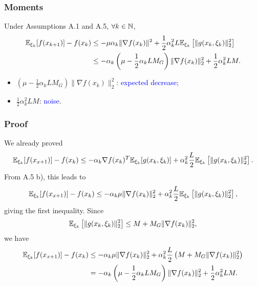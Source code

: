 \documentclass[usepdftitle=false, aspectratio=169]{beamer}
\begin{document}
\begin{frame}
\frametitle{Moments}

\begin{theorem}
	Under Assumptions A.1 and A.5, $\forall k \in {\mathbb{N}}$,
	\begin{align*}
		{\mathbb{E}}_{\xi_k}[f(x_{k+1})] - f(x_k)
		& \leq - \mu \alpha_k \| \nabla f(x_k) \|^2
		+ \frac{1}{2} \alpha_k^2 L {\mathbb{E}}_{\xi_k} \left[ \| g(x_k, \xi_k )\|_2^2 \right] \\
		& \leq - \alpha_k\left( \mu -\frac{1}{2}\alpha_k LM_G \right) \| \nabla f(x_k) \|_2^2
		+ \frac{1}{2} \alpha_k^2 LM.
	\end{align*}
\end{theorem}
\begin{itemize}
	\item $\left( \mu -\frac{1}{2}\alpha_k LM_G \right) \| \nabla f(x_k) \|_2^2$: \textcolor{blue}{expected decrease};
	\item $\frac{1}{2} \alpha_k^2 LM$: \textcolor{blue}{noise}.
\end{itemize}
\end{frame}

\begin{frame}
\frametitle{Proof}

We already proved
$$
	{\mathbb{E}}_{\xi_k} [f(x_{x+1})] - f(x_k) \leq - \alpha_k \nabla f(x_k)^T {\mathbb{E}}_{\xi_k} [ g(x_k, \xi_k) ] + \alpha_k^2 \frac{L}{2} {\mathbb{E}}_{\xi_k} \left[ \| g(x_k, \xi_k) \|^2_2 \right].	
$$
From A.5 b), this leads to
$$
{\mathbb{E}}_{\xi_k} [f(x_{x+1})] - f(x_k) \leq - \alpha_k \mu \| \nabla f(x_k) \|_2^2 + \alpha_k^2 \frac{L}{2} {\mathbb{E}}_{\xi_k} \left[ \| g(x_k, \xi_k) \|^2_2 \right],
$$
giving the first inequality. Since
$$
{\mathbb{E}}_{\xi_k} \left[ \| g(x_k, \xi_k) \|^2_2 \right] \leq M + M_G \| \nabla f(x_k) \|_2^2,
$$
we have
\begin{align*}
{\mathbb{E}}_{\xi_k} [f(x_{x+1})] - f(x_k) & \leq - \alpha_k \mu \| \nabla f(x_k) \|_2^2 + \alpha_k^2 \frac{L}{2} \left( M + M_G \| \nabla f(x_k) \|_2^2 \right) \\
& =  - \alpha_k \left( \mu - \frac{1}{2} \alpha_k L M_G \right) \| \nabla f(x_k) \|_2^2 + \frac{1}{2} \alpha_k^2 LM.
\end{align*}

\end{frame}
\end{document}
